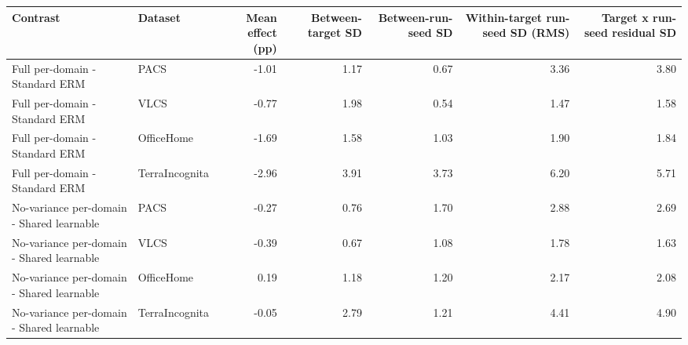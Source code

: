 \begin{tabular}{llrrrrr}
\toprule
Contrast & Dataset & Mean effect (pp) & Between-target SD & Between-run-seed SD & Within-target run-seed SD (RMS) & Target x run-seed residual SD \\
\midrule
Full per-domain - Standard ERM & PACS & -1.01 & 1.17 & 0.67 & 3.36 & 3.80 \\
Full per-domain - Standard ERM & VLCS & -0.77 & 1.98 & 0.54 & 1.47 & 1.58 \\
Full per-domain - Standard ERM & OfficeHome & -1.69 & 1.58 & 1.03 & 1.90 & 1.84 \\
Full per-domain - Standard ERM & TerraIncognita & -2.96 & 3.91 & 3.73 & 6.20 & 5.71 \\
No-variance per-domain - Shared learnable & PACS & -0.27 & 0.76 & 1.70 & 2.88 & 2.69 \\
No-variance per-domain - Shared learnable & VLCS & -0.39 & 0.67 & 1.08 & 1.78 & 1.63 \\
No-variance per-domain - Shared learnable & OfficeHome & 0.19 & 1.18 & 1.20 & 2.17 & 2.08 \\
No-variance per-domain - Shared learnable & TerraIncognita & -0.05 & 2.79 & 1.21 & 4.41 & 4.90 \\
\bottomrule
\end{tabular}
